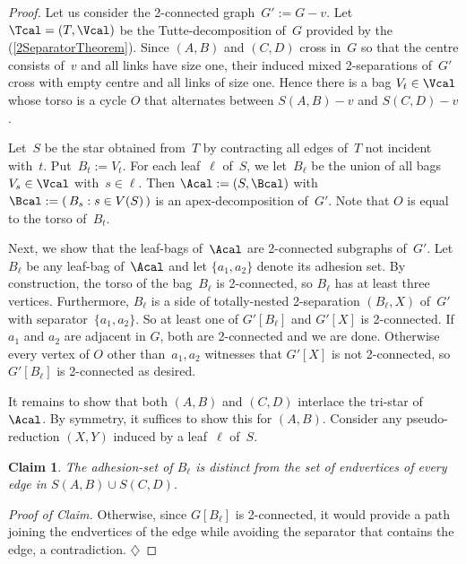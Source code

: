 \documentclass{aic}
\newenvironment{cproof}{\noindent\textit{Proof of Claim.}}{\phantom{!}\!\hfill$\diamondsuit$}
\theoremstyle{plain}
\newtheorem{sublem}{Claim}[thm]
\theoremstyle{definition}
\theoremstyle{plain}
\theoremstyle{plain}
\begin{document}
\begin{proof}
Let us consider the 2-connected graph~$G':=G-v$.
Let $\Tcal=(T,\Vcal)$ be the Tutte-decomposition of~$G$ provided by the  (\ref{2SeparatorTheorem}).
Since $(A,B)$ and $(C,D)$ cross in~$G$ so that the centre consists of~$v$ and all links have size one, their induced mixed 2-separations of~$G'$ cross with empty centre and all links of size one.
Hence there is a 
bag $V_t\in\Vcal$ whose torso is a cycle $O$ that
alternates between $S(A,B)-v$ and $S(C,D)-v$.

Let~$S$ be the star obtained from~$T$ by contracting 
all edges of~$T$ not incident with~$t$. 
Put~$B_t:=V_t$.
For each leaf~$\ell$ of~$S$, we let~$B_\ell$ be the union 
of all bags $V_s\in\Vcal$ with~$s\in \ell$. 
Then $\Acal:=(S,\Bcal)$ with $\Bcal:=(\,B_s: s\in V(S)\,)$ is an apex-decomposition of~$G'$.
Note that $O$ is equal to the torso of~$B_t$.

Next, we show that the leaf-bags of~$\Acal$ are 2-connected subgraphs of~$G'$.
Let~$B_\ell$ be any leaf-bag of~$\Acal$ and let $\{a_1,a_2\}$ denote its adhesion set.
By construction, the torso of the bag~$B_\ell$ is 2-connected, so $B_\ell$ has at least three vertices.
Furthermore, $B_\ell$ is a side of totally-nested 2-separation $(B_\ell,X)$ of~$G'$ with separator~$\{a_1,a_2\}$.
So at least one of $G'[B_\ell]$ and $G'[X]$ is 2-connected. If $a_1$ and $a_2$ are adjacent in $G$, both are 2-connected and we are done.
Otherwise every vertex of $O$ other than~$a_1,a_2$ witnesses that $G'[X]$ is not 2-connected, so $G'[B_\ell]$ is 2-connected as desired.

It remains to show that both $(A,B)$ and $(C,D)$ interlace the tri-star of~$\Acal$.
By symmetry, it suffices to show this for $(A,B)$.
Consider any pseudo-reduction $(X,Y)$ induced by a leaf~$\ell$ of~$S$.

\begin{sublem}\label{boldEdgeNoAdhesionSet}
The adhesion-set of $B_\ell$ is distinct from the set of endvertices of every edge in $S(A,B)\cup S(C,D)$.
\end{sublem}
\begin{cproof}
Otherwise, since $G[B_\ell]$ is 2-connected, it would provide a path joining the endvertices of the edge while avoiding the separator that contains the edge, a contradiction.
\end{cproof}\medskip


\end{proof}
\end{document}
